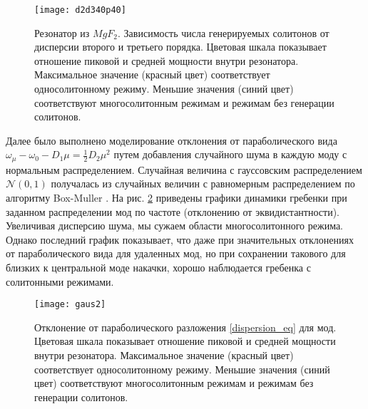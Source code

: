\begin{figure}
  \centering
  \texttt{[image: d2d340p40]}
  \caption{Резонатор из $MgF_2$. Зависимость числа генерируемых солитонов от дисперсии второго и третьего порядка. Цветовая шкала показывает отношение пиковой и средней мощности внутри резонатора. Максимальное значение (красный цвет) соответствует односолитонному режиму. Меньшие значения (синий цвет) соответствуют многосолитонным режимам и режимам без генерации солитонов.} \label{d2d3_plot}
\end{figure}

Далее было выполнено моделирование отклонения от параболического вида $\omega_\mu-\omega_0-D_1\mu=\frac{1}{2}D_2\mu^2$ путем добавления случайного шума в каждую моду с нормальным распределением. Случайная величина с гауссовским распределением $\mathcal{N}(0,1)$ получалась из случайных величин с равномерным распределением по алгоритму Box-Muller \cite{Press2002}. На рис. \ref{gaus} приведены графики динамики гребенки при заданном распределении мод по частоте (отклонению от эквидистантности). Увеличивая дисперсию шума, мы сужаем области многосолитонного режима. Однако последний график показывает, что даже при значительных отклонениях от параболического вида для удаленных мод, но при сохранении такового для близких к центральной моде накачки, хорошо наблюдается гребенка с солитонными режимами.

\begin{figure}
  \centering
  \texttt{[image: gaus2]}
  \caption{Отклонение от параболического разложения \eqref{dispersion_eq} для мод. Цветовая шкала показывает отношение пиковой и средней мощности внутри резонатора. Максимальное значение (красный цвет) соответствует односолитонному режиму. Меньшие значения (синий цвет) соответствуют многосолитонным режимам и режимам без генерации солитонов.} \label{gaus}
\end{figure}


